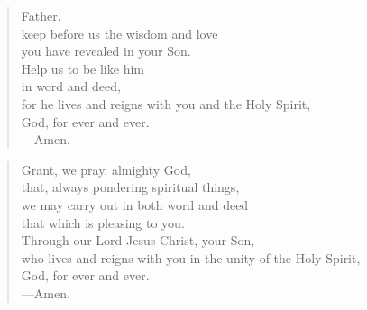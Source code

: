 \prayer

\setlength{\leftmargini}{\prayerleftmargini}

\begin{verse}
Father,\\
keep before us the wisdom and love\\
you have revealed in your Son.\\
Help us to be like him\\
in word and deed,\\
for he lives and reigns with you and the Holy Spirit,\\
God, for ever and ever.\\
{\color{red}---\thinspace}Amen.
\end{verse}


\begin{verse}
Grant, we pray, almighty God,\\
that, always pondering spiritual things,\\
we may carry out in both word and deed\\
that which is pleasing to you.\\
Through our Lord Jesus Christ, your Son,\\
who lives and reigns with you in the unity of the Holy Spirit,\\
God, for ever and ever.\\
{\color{red}---\thinspace}Amen.
\end{verse}

\setlength{\leftmargini}{\defleftmargini}